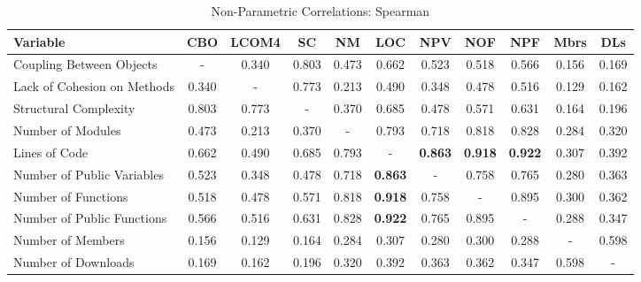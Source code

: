\documentclass[conference]{IEEEtran}
\begin{document}
\begin{center}
\begin{table}[bt]
\centering \caption{Non-Parametric Correlations: Spearman}
\begin{tabular}{|l|c|c|c|c|c|c|c|c|c|c|} \hline

\textbf{Variable}             & CBO & LCOM4 & SC & NM & LOC & NPV & NOF & NPF & Mbrs & DLs
\\ \hline
Coupling Between Objects        & - & 0.340 & 0.803 & 0.473 & 0.662 & 0.523 & 0.518 & 0.566 & 0.156 & 0.169
\\ \hline
Lack of Cohesion on Methods   & 0.340 & - & 0.773 & 0.213 & 0.490 & 0.348 & 0.478 & 0.516 & 0.129 & 0.162
\\ \hline
Structural Complexity         & 0.803 & 0.773 & - & 0.370 & 0.685 & 0.478 & 0.571 & 0.631 & 0.164 & 0.196
\\ \hline
Number of Modules             & 0.473 & 0.213 & 0.370 & - & 0.793 & 0.718 & 0.818 & 0.828 & 0.284 & 0.320
\\ \hline
Lines of Code                 & 0.662 & 0.490 & 0.685 & 0.793 & - & \textbf{0.863} & \textbf{0.918} & \textbf{0.922} & 0.307 & 0.392
\\ \hline
Number of Public Variables    & 0.523 & 0.348 & 0.478 & 0.718 & \textbf{0.863} & - & 0.758 & 0.765 & 0.280 & 0.363
\\ \hline
Number of Functions           & 0.518 & 0.478 & 0.571 & 0.818 & \textbf{0.918} & 0.758 & - & 0.895 & 0.300 & 0.362
\\ \hline
Number of Public Functions    & 0.566 & 0.516 & 0.631 & 0.828 & \textbf{0.922} & 0.765 & 0.895 & - & 0.288 & 0.347
\\ \hline
Number of Members             & 0.156 & 0.129 & 0.164 & 0.284 & 0.307 & 0.280 & 0.300 & 0.288 & - & 0.598
\\ \hline
Number of Downloads           & 0.169 & 0.162 & 0.196 & 0.320 & 0.392 & 0.363 & 0.362 & 0.347 & 0.598 & -
\\ \hline
\end{tabular}
\label{spearman}
\end{table}
\end{center}
\end{document}
